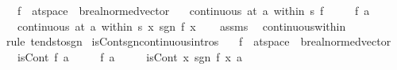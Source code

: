 \begin{isabellebody}
\ \ \ f\ {\isacharcolon}{\kern0pt}{\isacharcolon}{\kern0pt}\ {\isachardoublequoteopen}{\isacharprime}{\kern0pt}a{\isacharcolon}{\kern0pt}{\isacharcolon}{\kern0pt}t{}{\isacharunderscore}{\kern0pt}space\ {\isasymRightarrow}\ {\isacharprime}{\kern0pt}b{\isacharcolon}{\kern0pt}{\isacharcolon}{\kern0pt}real{\isacharunderscore}{\kern0pt}normed{\isacharunderscore}{\kern0pt}vector{\isachardoublequoteclose}\isanewline
\ \ \ {\isachardoublequoteopen}continuous\ {\isacharparenleft}{\kern0pt}at\ a\ within\ s{\isacharparenright}{\kern0pt}\ f{\isachardoublequoteclose}\isanewline
\ \ \ \ \ {\isachardoublequoteopen}f\ a\ {\isasymnoteq}\ {}{\isachardoublequoteclose}\isanewline
\ \ \ {\isachardoublequoteopen}continuous\ {\isacharparenleft}{\kern0pt}at\ a\ within\ s{\isacharparenright}{\kern0pt}\ {\isacharparenleft}{\kern0pt}{\isasymlambda}x{\isachardot}{\kern0pt}\ sgn\ {\isacharparenleft}{\kern0pt}f\ x{\isacharparenright}{\kern0pt}{\isacharparenright}{\kern0pt}{\isachardoublequoteclose}\isanewline
%
\isadelimproof
\ \ %
\endisadelimproof
%
\isatagproof
{}\isamarkupfalse%
\ assms\ \isamarkupfalse%
\ continuous{\isacharunderscore}{\kern0pt}within\ \isamarkupfalse%
\ {\isacharparenleft}{\kern0pt}rule\ tendsto{\isacharunderscore}{\kern0pt}sgn{\isacharparenright}{\kern0pt}%
\endisatagproof
{\isafoldproof}%
%
\isadelimproof
\isanewline
%
\endisadelimproof
\isanewline
{}\isamarkupfalse%
\ isCont{\isacharunderscore}{\kern0pt}sgn{\isacharbrackleft}{\kern0pt}continuous{\isacharunderscore}{\kern0pt}intros{\isacharbrackright}{\kern0pt}{\isacharcolon}{\kern0pt}\isanewline
\ \ \ f\ {\isacharcolon}{\kern0pt}{\isacharcolon}{\kern0pt}\ {\isachardoublequoteopen}{\isacharprime}{\kern0pt}a{\isacharcolon}{\kern0pt}{\isacharcolon}{\kern0pt}t{}{\isacharunderscore}{\kern0pt}space\ {\isasymRightarrow}\ {\isacharprime}{\kern0pt}b{\isacharcolon}{\kern0pt}{\isacharcolon}{\kern0pt}real{\isacharunderscore}{\kern0pt}normed{\isacharunderscore}{\kern0pt}vector{\isachardoublequoteclose}\isanewline
\ \ \ {\isachardoublequoteopen}isCont\ f\ a{\isachardoublequoteclose}\isanewline
\ \ \ \ \ {\isachardoublequoteopen}f\ a\ {\isasymnoteq}\ {}{\isachardoublequoteclose}\isanewline
\ \ \ {\isachardoublequoteopen}isCont\ {\isacharparenleft}{\kern0pt}{\isasymlambda}x{\isachardot}{\kern0pt}\ sgn\ {\isacharparenleft}{\kern0pt}f\ x{\isacharparenright}{\kern0pt}{\isacharparenright}{\kern0pt}\ a{\isachardoublequoteclose}\isanewline

\end{isabellebody}
